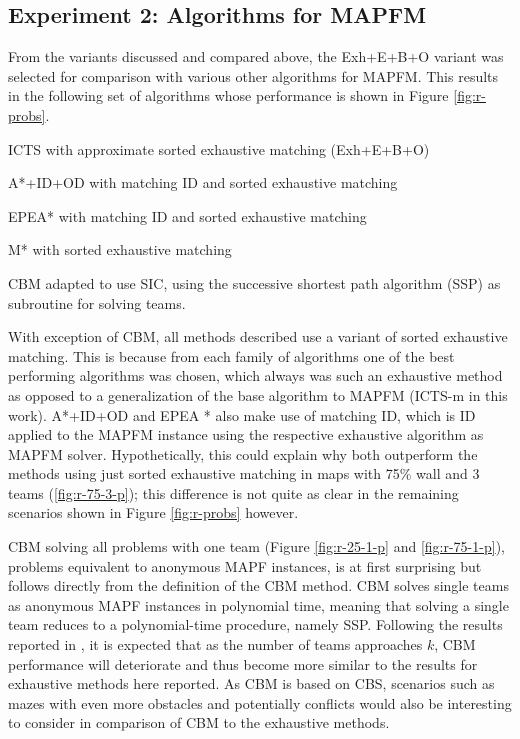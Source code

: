 \documentclass[english,10pt]{article}
\begin{document}
	\subsection{Experiment 2: Algorithms for MAPFM}
	From the variants discussed and compared above, the Exh+E+B+O variant was selected for comparison with various other algorithms for MAPFM. This results in the following set of algorithms whose performance is shown in Figure \ref{fig:r-probs}.
	\begin{itemize}
		\begin{minipage}{0.45\linewidth}
			\item ICTS with approximate sorted exhaustive matching (Exh+E+B+O)
			\item A*+ID+OD with matching ID and sorted exhaustive matching\cite{bruin2021}
			\item EPEA* with matching ID and sorted exhaustive matching\cite{jong2021}
		\end{minipage}
		\hspace{1cm}
		\begin{minipage}{0.40\linewidth}
			\item M* with sorted exhaustive matching\cite{donszelmann2021}
			\item CBM adapted to use SIC, using the successive shortest path algorithm (SSP) \cite{goldberg1987} as subroutine for solving teams\cite{baauw2021}.
		\end{minipage}
	\end{itemize}
	With exception of CBM, all methods described use a variant of sorted exhaustive matching. This is because from each family of algorithms one of the best performing algorithms was chosen, which always was such an exhaustive method as opposed to a generalization of the base algorithm to MAPFM (ICTS-m in this work). A*+ID+OD and EPEA * also make use of matching ID, which is ID applied to the MAPFM instance using the respective exhaustive algorithm as MAPFM solver. Hypothetically, this could explain why both outperform the methods using just sorted exhaustive matching in maps with 75\% wall and 3 teams (\ref{fig:r-75-3-p}); this difference is not quite as clear in the remaining scenarios shown in Figure \ref{fig:r-probs} however. 
	
	CBM solving all problems with one team (Figure \ref{fig:r-25-1-p} and \ref{fig:r-75-1-p}), problems equivalent to anonymous MAPF instances, is at first surprising but follows directly from the definition of the CBM method. CBM solves single teams as anonymous MAPF instances in polynomial time, meaning that solving a single team reduces to a polynomial-time procedure, namely SSP. Following the results reported in \cite{ma2016}, it is expected that as the number of teams approaches $k$, CBM performance will deteriorate and thus become more similar to the results for exhaustive methods here reported. As CBM is based on CBS, scenarios such as mazes with even more obstacles and potentially conflicts would also be interesting to consider in comparison of CBM to the exhaustive methods.
\end{document}
